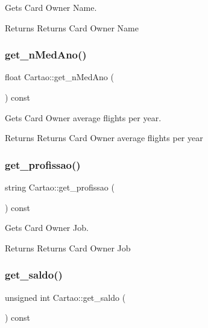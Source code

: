 Gets Card Owner Name. 

\begin{DoxyReturn}{Returns}
Returns Card Owner Name 
\end{DoxyReturn}
\mbox{\label{class_cartao_a2001b8921b99f653a8c9c8f3415e0473}} 
\subsubsection{\texorpdfstring{get\+\_\+n\+Med\+Ano()}{get\_nMedAno()}}
{\footnotesize\ttfamily float Cartao\+::get\+\_\+n\+Med\+Ano (\begin{DoxyParamCaption}{ }\end{DoxyParamCaption}) const}



Gets Card Owner average flights per year. 

\begin{DoxyReturn}{Returns}
Returns Card Owner average flights per year 
\end{DoxyReturn}
\mbox{\label{class_cartao_ab15681caa81d97f72a0b83b38ede4416}} 
\subsubsection{\texorpdfstring{get\+\_\+profissao()}{get\_profissao()}}
{\footnotesize\ttfamily string Cartao\+::get\+\_\+profissao (\begin{DoxyParamCaption}{ }\end{DoxyParamCaption}) const}



Gets Card Owner Job. 

\begin{DoxyReturn}{Returns}
Returns Card Owner Job 
\end{DoxyReturn}
\mbox{\label{class_cartao_ae3ea4d5846e25c43b0d7ea0c03217213}} 
\subsubsection{\texorpdfstring{get\+\_\+saldo()}{get\_saldo()}}
{\footnotesize\ttfamily unsigned int Cartao\+::get\+\_\+saldo (\begin{DoxyParamCaption}{ }\end{DoxyParamCaption}) const}



